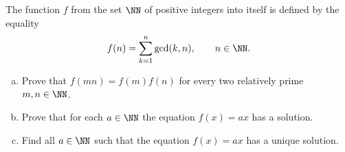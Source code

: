 
\begin{problem}[ISL 2004 N2]
    The function $f$ from the set $\NN$ of positive integers into itself is defined by the equality
    \[f(n) = \sum_{k=1}^n \gcd(k,n),\qquad n \in \NN.\]
    \begin{enumerate}[(a)]
      \item Prove that $f(mn)=f(m)f(n)$ for every two relatively prime $m,n \in \NN$.
      \item Prove that for each $a \in \NN$ the equation $f(x) = ax$ has a solution.
      \item Find all $a \in \NN$ such that the equation $f(x) = ax$ has a unique solution.
    \end{enumerate}
\end{problem}

